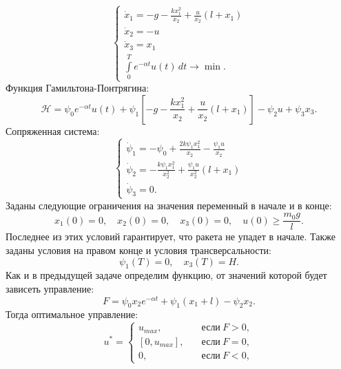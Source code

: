 \documentclass[12pt, a4paper]{article} %
\renewcommand{\ge}{\geqslant}
\begin{document}
\begin{equation}
    \begin{cases}
        \displaystyle
        \dot x_1 = -g - \frac{kx_1^2}{x_2} + \frac{u}{x_2}(l + x_1) \\
        \displaystyle
        \dot x_2 = -u \\
        \displaystyle
        \dot x_3 = x_1 \\
        \displaystyle
        \int\limits_{0}^{T} e^{-\alpha t} u(t)\,dt \rightarrow \min.
    \end{cases} 
\end{equation} 
Функция Гамильтона-Понтрягина:
\begin{equation}
    \mathscr{H} = \psi_0 e^{-\alpha t} u(t) +
    \psi_1 \left[ -g - \frac{kx_1^2}{x_2} + \frac{u}{x_2}(l + x_1) \right] -
    \psi_2 u + \psi_3 x_3
.\end{equation}
Сопряженная система:
\begin{equation}\label{eq:1_conj}
\begin{cases}
    \displaystyle
    \dot \psi_1 = -\psi_0 + \frac{2k\psi_1x_1^2}{x_2} -
        \frac{\psi_1 u}{x_2} \\
    \displaystyle
    \dot \psi_2 = -\frac{k\psi_1x_1^2}{x_2^2} +
        \frac{\psi_1u}{x_2^2}(l + x_1) \\
    \dot \psi_3 = 0.
\end{cases}     
\end{equation}
Заданы следующие ограничения на значения переменный в начале и в конце:
\[
    x_1(0) = 0, \quad x_2(0) = 0, \quad x_3(0) = 0, \quad 
    u(0) \ge \frac{m_0 g}{l}
.\]
Последнее из этих условий гарантирует, что ракета не упадет в начале.
Также заданы условия на правом конце и условия трансверсальности:
\[
    \psi_1(T) = 0,\quad x_3(T) = H
.\] 
Как и в предыдущей задаче определим функцию, от значений которой будет зависеть управление:
\begin{equation}\label{eq:2_F}
    F = \psi_0 x_2 e^{-\alpha t} + \psi_1(x_1 + l) - \psi_2 x_2
.\end{equation} 
Тогда оптимальное управление:
\begin{equation}\label{eq:1_opt_control}
    u^* = \left\{
    \begin{aligned}
        u_{max}, \quad &\text{если}\ F > 0, \\
        [0, u_{max}], \quad &\text{если}\ F = 0, \\
        0, \quad &\text{если}\ F < 0,
    \end{aligned} 
    \right.
\end{equation} 
\end{document}
